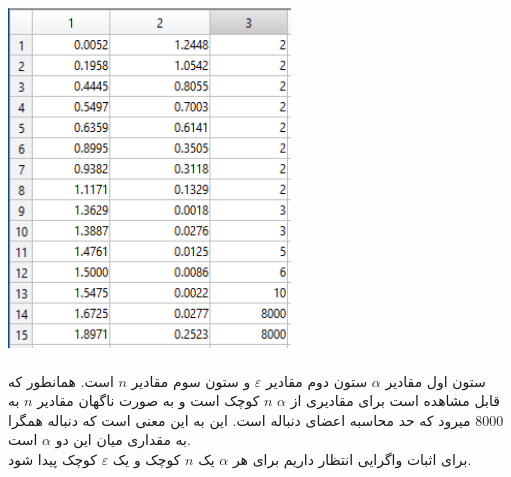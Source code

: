 \documentclass[12pt, letterpaper]{article}
\begin{document}
\includegraphics[height=10cm, width=75mm]{figure4.png}
\vspace{10mm}
\\
ستون اول مقادیر 
$\alpha$ 
ستون دوم مقادیر 
$\varepsilon$ 
و ستون سوم مقادیر 
$n$ 
است. همانطور که قابل مشاهده است برای مقادیری از 
$\alpha$ $n$ 
کوچک است و به صورت ناگهان مقادیر 
$n$
 به
 $8000$ 
میرود که حد محاسبه اعضای دنباله است. این به این معنی است که دنباله همگرا به مقداری میان این دو 
$\alpha$
 است.
\\
برای اثبات واگرایی انتظار داریم برای هر 
$\alpha$
یک 
$n$
کوچک و یک 
$\varepsilon$
 کوچک پیدا شود.
\end{document}
